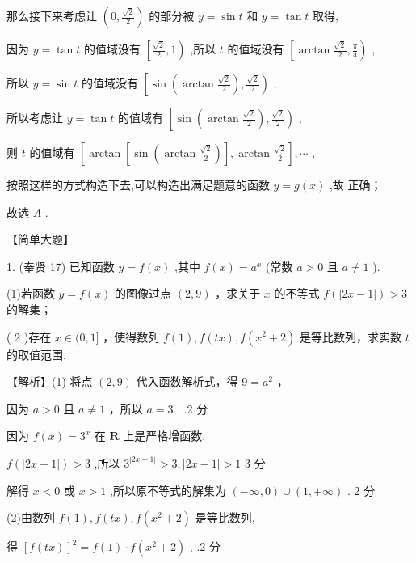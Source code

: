 \documentclass[10pt]{article}
\newcommand*\circled[1]{\tikz[baseline=(char.base)]{\node[shape=circle,draw,inner sep=1.5pt] (char) {\small #1};}}
\begin{document}
那么接下来考虑让 \(\left( {0,\frac{\sqrt{2}}{2}}\right)\) 的部分被 \(y = \sin t\) 和 \(y = \tan t\) 取得,

因为 \(y = \tan t\) 的值域没有 \(\left\lbrack  {\frac{\sqrt{2}}{2},1}\right)\) ,所以 \(t\) 的值域没有 \(\left\lbrack  {\arctan \frac{\sqrt{2}}{2},\frac{\pi }{4}}\right)\) ,

所以 \(y = \sin t\) 的值域没有 \(\left\lbrack  {\sin \left( {\arctan \frac{\sqrt{2}}{2}}\right) ,\frac{\sqrt{2}}{2}}\right)\) ,

所以考虑让 \(y = \tan t\) 的值域有 \(\left\lbrack  {\sin \left( {\arctan \frac{\sqrt{2}}{2}}\right) ,\frac{\sqrt{2}}{2}}\right)\) ,

则 \(t\) 的值域有 \(\left\lbrack  {\arctan \left\lbrack  {\sin \left( {\arctan \frac{\sqrt{2}}{2}}\right) }\right\rbrack  ,\arctan \frac{\sqrt{2}}{2}}\right\rbrack  ,\cdots\) ,

按照这样的方式构造下去,可以构造出满足题意的函数 \(y = g\left( x\right)\) ,故 \circled{2} 正确；

故选 \(A\) .

【简单大题】

1. (奉贤 17) 已知函数 \(y = f\left( x\right)\) ,其中 \(f\left( x\right)  = {a}^{x}\) (常数 \(a > 0\) 且 \(a \neq  1\) ).

(1)若函数 \(y = f\left( x\right)\) 的图像过点 \(\left( {2,9}\right)\) ，求关于 \(x\) 的不等式 \(f\left( \left| {{2x} - 1}\right| \right)  > 3\) 的解集；

( 2 )存在 \(x \in  (0,1\rbrack\) ，使得数列 \(f\left( 1\right) ,f\left( {tx}\right) ,f\left( {{x}^{2} + 2}\right)\) 是等比数列，求实数 \(t\) 的取值范围.

【解析】(1) 将点 \(\left( {2,9}\right)\) 代入函数解析式，得 \(9 = {a}^{2}\) ，

因为 \(a > 0\) 且 \(a \neq  1\) ，所以 \(a = 3\) . .2 分

因为 \(f\left( x\right)  = {3}^{x}\) 在 \(\mathbf{R}\) 上是严格增函数,

\(f\left( \left| {{2x} - 1}\right| \right)  > 3\) ,所以 \({3}^{\left| 2x - 1\right| } > 3,\left| {{2x} - 1}\right|  > 1\) 3 分

解得 \(x < 0\) 或 \(x > 1\) ,所以原不等式的解集为 \(\left( {-\infty ,0}\right)  \cup  \left( {1, + \infty }\right)\) . 2 分

(2)由数列 \(f\left( 1\right) ,f\left( {tx}\right) ,f\left( {{x}^{2} + 2}\right)\) 是等比数列,

得 \({\left\lbrack  f\left( tx\right) \right\rbrack  }^{2} = f\left( 1\right)  \cdot  f\left( {{x}^{2} + 2}\right)\) , .2 分
\end{document}

